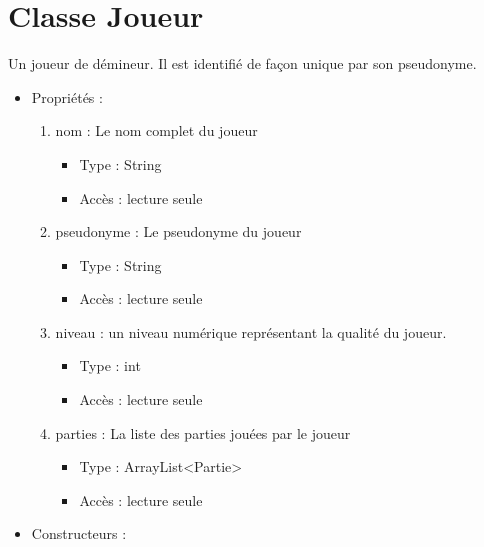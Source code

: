 \section {Classe Joueur}

Un joueur de démineur. Il est identifié de façon unique par son pseudonyme.

\begin{itemize}

\item Propriétés : 
  \begin{enumerate}
  \item nom : Le nom complet du joueur 
    \begin{itemize}
    \item Type : String
    \item Accès : lecture seule
    \end{itemize}
  \item pseudonyme : Le pseudonyme du joueur
    \begin{itemize}
    \item Type : String
    \item Accès : lecture seule
    \end{itemize}
  \item niveau : un niveau numérique représentant la qualité du joueur.
    \begin{itemize}
    \item Type : int
    \item Accès : lecture seule
    \end{itemize}
  \item parties : La liste des parties jouées par le joueur
    \begin{itemize}
    \item Type : ArrayList<Partie>
    \item Accès : lecture seule
    \end{itemize}
  \end{enumerate}

\item Constructeurs : 


\end{itemize}
